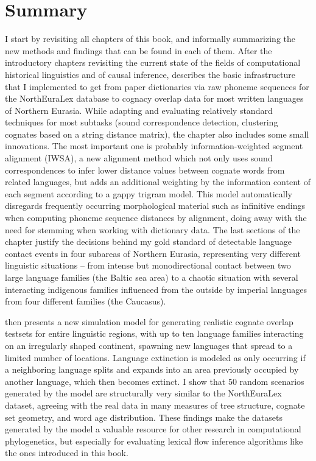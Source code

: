 \section{Summary}
I start by revisiting all chapters of this book, and informally summarizing the new methods and findings that can be found in each of them. After the introductory chapters revisiting the current state of the fields of computational historical linguistics and of causal inference,  describes the basic infrastructure that I implemented to get from paper dictionaries via raw phoneme sequences for the NorthEuraLex database to cognacy overlap data for most written languages of Northern Eurasia. While adapting and evaluating relatively standard techniques for most subtasks (sound correspondence detection, clustering cognates based on a string distance matrix), the chapter also includes some small innovations. The most important one is probably information-weighted segment alignment (IWSA), a new alignment method which not only uses sound correspondences to infer lower distance values between cognate words from related languages, but adds an additional weighting by the information content of each segment according to a gappy trigram model. This model automatically disregards frequently occurring morphological material such as infinitive endings when computing phoneme sequence distances by alignment, doing away with the need for stemming when working with dictionary data. The last sections of the chapter justify the decisions behind my gold standard of detectable language contact events in four subareas of Northern Eurasia, representing very different linguistic situations -- from intense but monodirectional contact between two large language families (the Baltic sea area) to a chaotic situation with several interacting indigenous families influenced from the outside by imperial languages from four different families (the Caucasus).

 then presents a new simulation model for generating realistic cognate overlap testsets for entire linguistic regions, with up to ten language families interacting on an irregularly shaped continent, spawning new languages that spread to a limited number of locations. Language extinction is modeled as only occurring if a neighboring language splits and expands into an area previously occupied by another language, which then becomes extinct. I show that 50 random scenarios generated by the model are structurally very similar to the NorthEuraLex dataset, agreeing with the real data in many measures of tree structure, cognate set geometry, and word age distribution. These findings make the datasets generated by the model a valuable resource for other research in computational phylogenetics, but especially for evaluating lexical flow inference algorithms like the ones introduced in this book.

